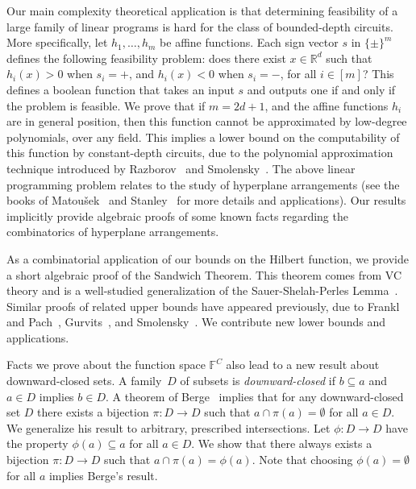 \documentclass[11pt]{article}
\theoremstyle{definition}
\newcommand{\1}{\mathbf{1}}
\newcommand{\R}{{\mathbb R}}
\newcommand{\F}{{\mathbb F}}
\begin{document}
Our main complexity theoretical application is that determining feasibility of a large family of linear programs is hard for the class of bounded-depth circuits.  
More specifically, let $h_1,\ldots,h_m$ be affine functions. Each sign vector $s$ in $\{\pm\}^m$ defines the following feasibility problem: does there exist $x\in \R^d$ such that $h_i(x) > 0$ when $s_i=+$, and $h_i(x) < 0$ when $s_i=-$, for all $i \in [m]$?  This defines a boolean function that takes an input $s$ and outputs one if and only if the problem is feasible.  We prove that if $m=2d+1$, and the affine functions $h_i$ are in general position, then this function cannot be approximated by low-degree polynomials, over any field.  This implies a lower bound on the computability of this function by constant-depth circuits, due to the polynomial approximation technique introduced by Razborov~\cite{razborov} and Smolensky~\cite{smolensky87}.   The above linear programming problem relates to the study of hyperplane arrangements (see the books of Matou\v{s}ek~\cite{matousek} and Stanley~\cite{stanley} for more details and applications).   Our results implicitly provide algebraic proofs of some known facts regarding the combinatorics of hyperplane arrangements.

As a combinatorial application of our bounds on the Hilbert function, we  provide a short algebraic proof of the Sandwich Theorem.  This theorem comes from VC theory and is a well-studied generalization of the Sauer-Shelah-Perles Lemma~\cite{Law, pajor,BR89, br, dress,ShatNews, Dress2,moran_thesis,KozmaM13,MeszarosR14,MoranW15}.   Similar proofs of related upper bounds have appeared previously, due to Frankl and Pach~\cite{babai-frankl}, Gurvits~\cite{gurvits}, and Smolensky~\cite{smolensky-vc}.  We contribute new lower bounds and applications.

Facts we prove about the function space $\F^C$ also lead to a new result about downward-closed sets.  A family~$D$ of subsets is {\em downward-closed} if $b \subseteq a$ and $a \in D$ implies $b \in D$.   A theorem of Berge~\cite{berge} implies that for any downward-closed set $D$  there exists a bijection $\pi: D \to D$ such that $a \cap \pi(a) = \emptyset$ for all $a \in D$. We generalize his result to arbitrary, prescribed intersections.  Let $\phi : D \to D$ have the property $\phi(a) \subseteq a$ for all $a \in D$.  We show that there always exists a bijection $\pi: D \to D$ such that $a \cap \pi(a) = \phi(a)$.   Note that choosing $\phi(a) = \emptyset$ for all $a$ implies Berge's result.
\end{document}
